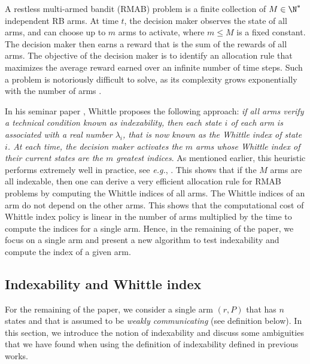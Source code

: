A restless multi-armed bandit (RMAB) problem is a finite collection of $M\in\N^*$ independent RB arms. At time $t$, the decision maker observes the state of all arms, and can choose up to $m$ arms to activate, where $m\le M$ is a fixed constant. The decision maker then earns a reward that is the sum of the rewards of all arms.
The objective of the decision maker is to identify an allocation rule that maximizes the average reward earned over an infinite number of time steps.
Such a problem is notoriously difficult to solve, as its complexity grows exponentially with the number of arms \cite{papadimitriou1994complexity}.

In his seminar paper \cite{whittle1988restless}, Whittle proposes the following approach: \textit{if all arms verify a technical condition known as \emph{indexability}, then each state $i$ of each arm is associated with a real number $\lambda_{i}$, that is now known as the \emph{Whittle index} of state $i$. At each time, the decision maker activates the $m$ arms whose Whittle index of their current states are the $m$ greatest indices}.  As mentioned earlier, this heuristic performs extremely well in practice, see \emph{e.g.}, \cite{glazebrook2006some, ansell2003whittle, glazebrook2002index}.  This shows that if the $M$ arms are all indexable, then one can derive a very efficient allocation rule for RMAB problems by computing the Whittle indices of all arms. The Whittle indices of an arm do not depend on the other arms. This shows that the computational cost of Whittle index policy is linear in the number of arms multiplied by the time to compute the indices for a single arm. Hence, in the remaining of the paper, we focus on a single arm and present a new algorithm to test indexability and compute the index of a given arm.

\subsection{Indexability and Whittle index}


For the remaining of the paper, we consider a single arm $(r, P)$ that has $n$ states and that is assumed to be \emph{weakly communicating} (see definition below). In this section, we introduce the notion of indexability and discuss some ambiguities that we have found when using the definition of indexability defined in previous works.

